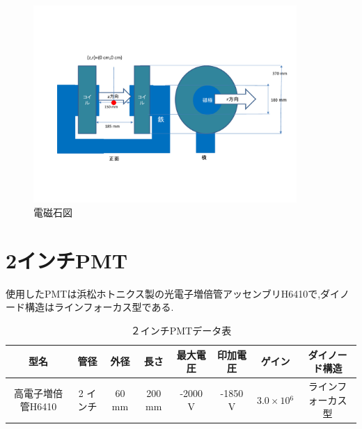 \begin{figure}[H]
	\centering
		\includegraphics[width=10cm]{fig/iguchi/magnetfigure.pdf}
	\caption{電磁石図}
	\label{magnetfigure}
\end{figure}

\section{2インチPMT}
使用したPMTは浜松ホトニクス製の光電子増倍管アッセンブリH6410で,ダイノード構造はラインフォーカス型である.
\begin{table}[htb]
	\centering
	
	  \begin{tabular}{cccccccc}\hline
		型名& 管径 & 外径 & 長さ & 最大電圧 & 印加電圧 & ゲイン & ダイノード構造 \\ \hline \hline
		高電子増倍管H6410 & 2 インチ & 60 mm & 200 mm & -2000 V & -1850 V & $3.0\times10{^{6}}$ &ラインフォーカス型 \\ \hline
	\end{tabular}
	  \caption{２インチPMTデータ表}
\end{table}

